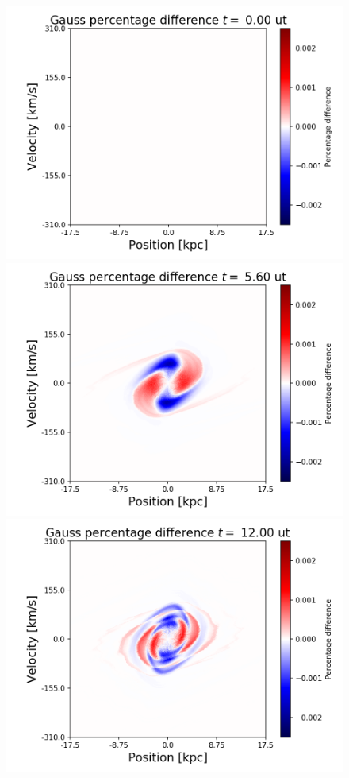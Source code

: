 \begin{figure}[h!]
    \centering
    \includegraphics[scale=0.45]{imag/cGaussPhase0.png}
    \includegraphics[scale=0.45]{imag/cGaussPhase14.png}
    \includegraphics[scale=0.45]{imag/cGaussPhase30.png}

\end{figure}
